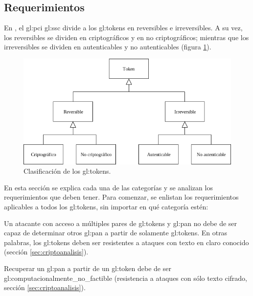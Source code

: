 %
%

\subsection{Requerimientos}

En \cite{pci_tokens}, el \gls{gl:pci} \gls{gl:ssc} divide a los
\glspl{gl:token} en reversibles e irreversibles. A su vez, los reversibles se
dividen en criptográficos y en no criptográficos; mientras que los
irreversibles se dividen en autenticables y no autenticables (figura
\ref{fig:division_tokens}).

\begin{figure}[H]
  \begin{center}
    \includegraphics[width=0.75\linewidth]
      {contenidos/analisis_y_disenio/tokens/requerimientos/diagramas/clasificacion.png}
    \caption{Clasificación de los \glspl{gl:token}.}
    \label{fig:division_tokens}
  \end{center}
\end{figure}

En esta sección se explica cada una de las categorías y se analizan los
requerimientos que deben tener. Para comenzar, se enlistan los requerimientos
aplicables a todos los \glspl{gl:token}, sin importar en qué categoría estén:


{
  Un atacante con acceso a múltiples pares de \glspl{gl:token} y
  \gls{gl:pan} no debe de ser capaz de determinar otros \gls{gl:pan} a partir
  de solamente \glspl{gl:token}. En otras palabras, los \glspl{gl:token}
  deben ser resistentes a ataques con texto en claro conocido (sección
  \ref{sec:criptoanalisis}).
}

{
  Recuperar un \gls{gl:pan} a partir de un \gls{gl:token} debe de ser
  \gls{gl:computacionalmente_no_factible} (resistencia a ataques con sólo
  texto cifrado, sección \ref{sec:criptoanalisis}).
}

